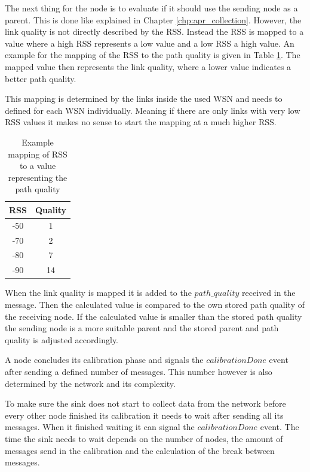 The next thing for the node is to evaluate if it should use the sending node as a parent. This is done like explained in Chapter \ref{chp:apr_collection}. However, the link quality is not directly described by the RSS. Instead the RSS is mapped to a value where a high RSS represents a low value and a low RSS a high value. An example for the mapping of the RSS to the path quality is given in Table \ref{tab:mappingRSSI}. The mapped value then represents the link quality, where a lower value indicates a better path quality.

This mapping is determined by the links inside the used WSN and needs to defined for each WSN individually. Meaning if there are only links with very low RSS values it makes no sense to start the mapping at a much higher RSS.

\begin{table}[htbp]
 \caption{Example mapping of RSS to a value representing the path quality}
 \centering
 \begin{tabular}{c|c}
  RSS & Quality\\ \toprule
  -50 & 1 \\
  -70 & 2 \\
  -80 & 7 \\
  -90 & 14 \\
 \end{tabular}
 \label{tab:mappingRSSI}
\end{table}

When the link quality is mapped it is added to the $path\_quality$ received in the message. Then the calculated value is compared to the own stored path quality of the receiving node. If the calculated value is smaller than the stored path quality the sending node is a more suitable parent and the stored parent and path quality is adjusted accordingly.   

A node concludes its calibration phase and signals the $calibrationDone$ event after sending a defined number of messages. This number however is also determined by the network and its complexity.  

To make sure the sink does not start to collect data from the network  before every other node finished its calibration it needs to wait after sending all its messages.
When it finished waiting it can signal the $calibrationDone$ event. The time the sink needs to wait depends on the number of nodes, the amount of messages send in the calibration and the calculation of the break between messages.
 
